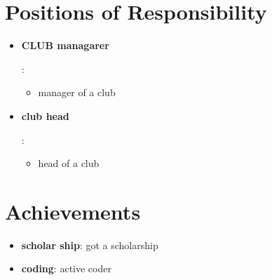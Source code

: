 \documentclass[a4paper,10pt]{report}
\newcommand{\resumeItem}[2]{
  \item\small{
    \textbf{#1}{: #2 \vspace{-2pt}}
  }
}
\newcommand{\resumeSubItem}[2]{\resumeItem{#1}{#2}\vspace{-4pt}}
\newcommand{\resumeSubHeadingListStart}{\begin{itemize}[leftmargin=*]}
\newcommand{\resumeSubHeadingListEnd}{\end{itemize}}
\begin{document}
 
 \vspace{4pt}


\section{Positions of Responsibility}
\resumeSubHeadingListStart

\resumeSubItem{CLUB managarer}
{\vspace{-7pt}
\begin{itemize}
\item manager of a club
\end{itemize} }

\resumeSubItem{club head}
{\vspace{-7pt}
\begin{itemize}
\item head of a club
\end{itemize} }


\vspace{-2pt}
\resumeSubHeadingListEnd


\vspace{4pt}


\section{Achievements}
\resumeSubHeadingListStart
  
\resumeSubItem{scholar ship}{got a scholarship}
\resumeSubItem{coding}{active coder}

\resumeSubHeadingListEnd
\end{document}
